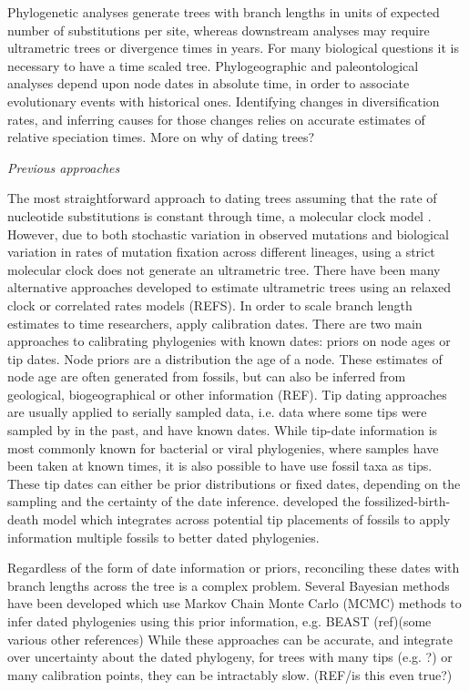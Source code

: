 \documentclass{llncs}
\newcommand{\ejmcomment}[1]{{\color{green} #1}}
\renewcommand{\subsection}[1]{%
\bigskip
\begin{center}
\begin{large}
\normalfont\itshape #1
\end{large}
\end{center}}
\begin{document}
\vspace{1.5in}

Phylogenetic analyses generate trees with branch lengths in units of expected number of substitutions per site,
whereas downstream analyses may require ultrametric trees or divergence times in years.
For many biological questions it is necessary to have a time scaled tree.
Phylogeographic and paleontological analyses depend upon node dates in absolute time,
in order to associate evolutionary events with historical ones.
Identifying changes in diversification rates, and inferring causes for those changes
relies on accurate estimates of relative speciation times.
\ejmcomment{More on why of dating trees?}

\subsection{Previous approaches}
The most straightforward approach to dating trees assuming that the rate of nucleotide 
substitutions is constant through time, a molecular clock model \citep{zuckerkandl1962}.
However, due to both stochastic variation in observed mutations and 
biological variation in rates of mutation fixation across different lineages,
using a strict molecular clock does not generate an ultrametric tree.
There have been many alternative approaches developed to estimate
ultrametric trees using an relaxed clock or correlated rates models (REFS).
In order to scale branch length estimates to time researchers, apply calibration dates. 
There are two main approaches to calibrating phylogenies with known dates:
priors on node ages or tip dates.
Node priors are a distribution the age of a node.
These estimates of node age are often generated from fossils,
but can also be inferred from geological, biogeographical or other information (REF).
Tip dating approaches are usually applied to serially sampled data, i.e. data where some tips were sampled by in the past,
and have known dates.
While tip-date information is most commonly known for bacterial or viral phylogenies,
where samples have been taken at known times,
it is also possible to have use fossil taxa as tips.
These tip dates can either be prior distributions or fixed dates, 
depending on the sampling and the certainty of the date inference.
\citet{Heath2014} developed the fossilized-birth-death model which 
integrates across potential tip placements of fossils
to apply information multiple fossils to better dated phylogenies.

Regardless of the form of date information or priors,
reconciling these dates with branch lengths across the tree is a complex problem.
Several Bayesian methods have been developed which use Markov Chain Monte Carlo (MCMC) methods
to infer dated phylogenies using this prior information, e.g. BEAST (ref)(some various other references)
While these approaches can be accurate, and integrate over uncertainty about the dated
phylogeny, for trees with many tips \ejmcomment{(e.g. ?)} or many calibration points, they can be intractably slow. 
\ejmcomment{(REF/is this even true?)}
\end{document}
